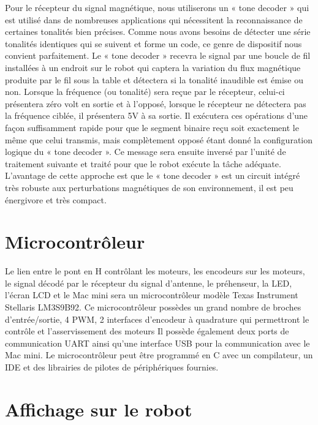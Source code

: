 Pour le récepteur du signal magnétique, nous utiliserons un « tone decoder » qui est utilisé dans de nombreuses applications qui nécessitent la reconnaissance de certaines tonalités bien précises. Comme nous avons besoins de détecter une série tonalités identiques qui se suivent et forme un code, ce genre de dispositif nous convient parfaitement. Le « tone decoder » recevra le signal par une boucle de fil installées à un endroit sur le robot qui captera la variation du flux magnétique produite par le fil sous la table et détectera si la tonalité inaudible est émise ou non. Lorsque la fréquence (ou tonalité) sera reçue par le récepteur, celui-ci présentera zéro volt en sortie et à l’opposé, lorsque le récepteur ne détectera pas la fréquence ciblée, il présentera 5V à sa sortie. Il exécutera ces opérations d’une façon suffisamment rapide pour que le segment binaire reçu soit exactement le même que celui transmis, mais complètement opposé étant donné la configuration logique du « tone decoder ».  Ce message sera ensuite inversé par l’unité de traitement suivante et traité pour que le robot exécute la tâche adéquate. L’avantage de cette approche est que le « tone decoder » est un circuit intégré très robuste aux perturbations magnétiques de son environnement, il est peu énergivore et très compact.

\section{Microcontrôleur} \label{s:micro}

Le lien entre le pont en H contrôlant les moteurs, les encodeurs sur les moteurs, le signal décodé par le récepteur du signal d'antenne, le préhenseur, la LED, l'écran LCD et le Mac mini sera un microcontrôleur modèle Texas Instrument Stellaris LM3S9B92. Ce microcontrôleur possèdes un grand nombre de broches d'entrée/sortie, 4 PWM, 2 interfaces d'encodeur à quadrature qui permettront le contrôle et l'asservissement des moteurs Il possède également deux ports de communication UART ainsi qu'une interface USB pour la communication avec le Mac mini. Le microcontrôleur peut être programmé en C avec un compilateur, un IDE et des librairies de pilotes de périphériques fournies.   

\section{Affichage sur le robot} \label{s:LCD}

